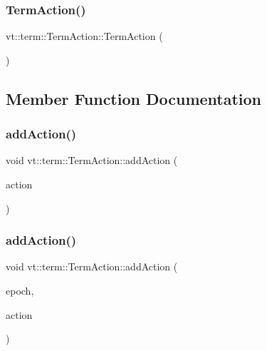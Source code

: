 \subsubsection{\texorpdfstring{Term\+Action()}{TermAction()}}
{\footnotesize\ttfamily vt\+::term\+::\+Term\+Action\+::\+Term\+Action (\begin{DoxyParamCaption}{ }\end{DoxyParamCaption})\hspace{0.3cm}{\ttfamily [default]}}



\subsection{Member Function Documentation}
\mbox{\label{structvt_1_1term_1_1_term_action_a1227042cb4eb38937fb8ed34bcbdf998}} 
\subsubsection{\texorpdfstring{add\+Action()}{addAction()}\hspace{0.1cm}{\footnotesize\ttfamily [1/2]}}
{\footnotesize\ttfamily void vt\+::term\+::\+Term\+Action\+::add\+Action (\begin{DoxyParamCaption}\item[{\hyperlink{namespacevt_ae0a5a7b18cc99d7b732cb4d44f46b0f3}{Action\+Type}}]{action }\end{DoxyParamCaption})}

\mbox{\label{structvt_1_1term_1_1_term_action_a15b79357805676e1ff2f880b02fd4061}} 
\subsubsection{\texorpdfstring{add\+Action()}{addAction()}\hspace{0.1cm}{\footnotesize\ttfamily [2/2]}}
{\footnotesize\ttfamily void vt\+::term\+::\+Term\+Action\+::add\+Action (\begin{DoxyParamCaption}\item[{\hyperlink{namespacevt_a81d11b28122d43bf9834577e4a06440f}{Epoch\+Type} const \&}]{epoch,  }\item[{\hyperlink{namespacevt_ae0a5a7b18cc99d7b732cb4d44f46b0f3}{Action\+Type}}]{action }\end{DoxyParamCaption})}

